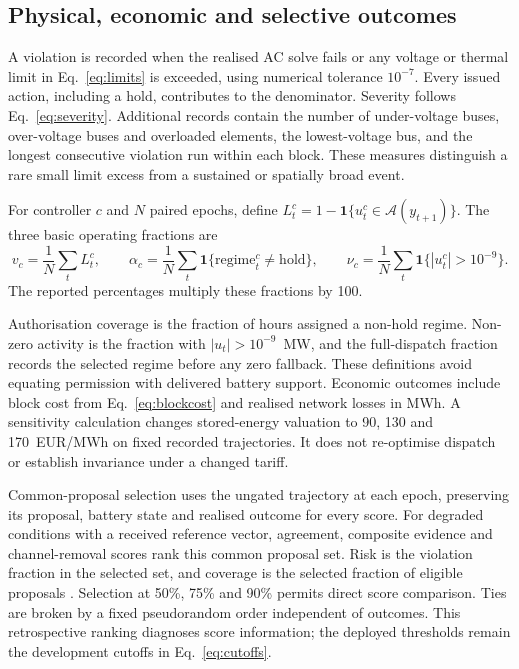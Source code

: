 \documentclass[preprint,12pt]{elsarticle}
\newcommand{\ind}{\mathbf{1}}
\begin{document}
\subsection{Physical, economic and selective outcomes}
A violation is recorded when the realised AC solve fails or any voltage or thermal limit in Eq.~\eqref{eq:limits} is exceeded, using numerical tolerance $10^{-7}$. Every issued action, including a hold, contributes to the denominator. Severity follows Eq.~\eqref{eq:severity}. Additional records contain the number of under-voltage buses, over-voltage buses and overloaded elements, the lowest-voltage bus, and the longest consecutive violation run within each block. These measures distinguish a rare small limit excess from a sustained or spatially broad event.

For controller $c$ and $N$ paired epochs, define $L_t^c=1-\ind\{u_t^c\in\mathcal A(y_{t+1})\}$. The three basic operating fractions are
\begin{equation}
v_c=\frac{1}{N}\sum_t L_t^c,\qquad
\alpha_c=\frac{1}{N}\sum_t\ind\{\mathrm{regime}_t^c\ne\mathrm{hold}\},\qquad
\nu_c=\frac{1}{N}\sum_t\ind\{|u_t^c|>10^{-9}\}.
\label{eq:operatingfractions}
\end{equation}
The reported percentages multiply these fractions by 100.

Authorisation coverage is the fraction of hours assigned a non-hold regime. Non-zero activity is the fraction with $|u_t|>10^{-9}$~MW, and the full-dispatch fraction records the selected regime before any zero fallback. These definitions avoid equating permission with delivered battery support. Economic outcomes include block cost from Eq.~\eqref{eq:blockcost} and realised network losses in MWh. A sensitivity calculation changes stored-energy valuation to 90, 130 and 170~EUR/MWh on fixed recorded trajectories. It does not re-optimise dispatch or establish invariance under a changed tariff.

Common-proposal selection uses the ungated trajectory at each epoch, preserving its proposal, battery state and realised outcome for every score. For degraded conditions with a received reference vector, agreement, composite evidence and channel-removal scores rank this common proposal set. Risk is the violation fraction in the selected set, and coverage is the selected fraction of eligible proposals \cite{geifman}. Selection at 50\%, 75\% and 90\% permits direct score comparison. Ties are broken by a fixed pseudorandom order independent of outcomes. This retrospective ranking diagnoses score information; the deployed thresholds remain the development cutoffs in Eq.~\eqref{eq:cutoffs}.
\end{document}

